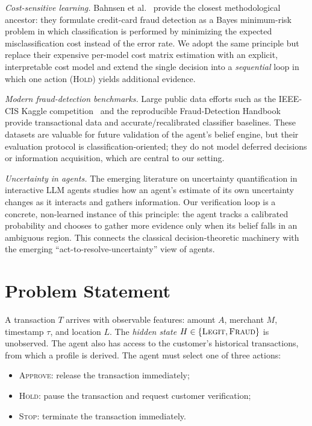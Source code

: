 \documentclass{article}
\begin{document}
\emph{Cost-sensitive learning.} Bahnsen et al.~\cite{bahnsen2013} provide the
closest methodological ancestor: they formulate credit-card fraud detection as
a Bayes minimum-risk problem in which classification is performed by
minimizing the expected misclassification cost instead of the error rate. We
adopt the same principle but replace their expensive per-model cost matrix
estimation with an explicit, interpretable cost model and extend the single
decision into a \emph{sequential} loop in which one action
(\textsc{Hold}) yields additional evidence.

\emph{Modern fraud-detection benchmarks.} Large public data efforts such as the
IEEE-CIS Kaggle competition~\cite{iececis2019} and the reproducible
Fraud-Detection Handbook~\cite{leborgen2021} provide transactional data and
accurate/recalibrated classifier baselines. These datasets are valuable for
future validation of the agent's belief engine, but their evaluation protocol
is classification-oriented; they do not model deferred decisions or
information acquisition, which are central to our setting.

\emph{Uncertainty in agents.} The emerging literature on uncertainty
quantification in interactive LLM agents studies how an agent's estimate of
its own uncertainty changes as it interacts and gathers information. Our
verification loop is a concrete, non-learned instance of this principle: the
agent tracks a calibrated probability and chooses to gather more evidence only
when its belief falls in an ambiguous region. This connects the classical
decision-theoretic machinery with the emerging ``act-to-resolve-uncertainty''
view of agents.

\section{Problem Statement}

A transaction $T$ arrives with observable features: amount $A$, merchant $M$,
timestamp $\tau$, and location $L$. The \emph{hidden state} $H \in
\{\textsc{Legit}, \textsc{Fraud}\}$ is unobserved. The agent also has access to
the customer's historical transactions, from which a profile is derived. The
agent must select one of three actions:

\begin{itemize}
  \item \textsc{Approve}: release the transaction immediately;
  \item \textsc{Hold}: pause the transaction and request customer verification;
  \item \textsc{Stop}: terminate the transaction immediately.
\end{itemize}
\end{document}
